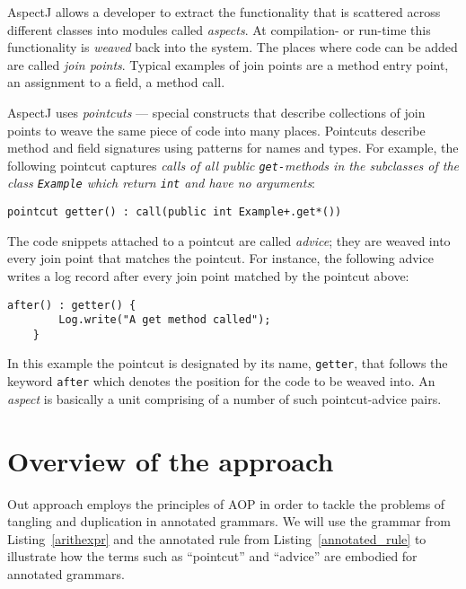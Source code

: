 \documentclass{IOS-Book-Article}     %
\newcommand{\lstref}[1]{Listing~\ref{#1}}
\begin{document}
AspectJ allows a developer to extract the functionality that is scattered across different classes into modules called \emph{aspects}. At compilation- or run-time this functionality is \emph{weaved} back into the system. The places where code can be added are called \emph{join points}. Typical examples of join points are a method entry point, an assignment to a field, a method call. 

AspectJ uses \emph{pointcuts} --- special constructs that describe collections of join points to weave the same piece of code into many places. Pointcuts describe method and field signatures using patterns for names and types. For example, the following pointcut captures \textit{calls of all public \texttt{get-}methods in the subclasses of the class \texttt{Example} which return \texttt{int} and have no arguments}:
\begin{lstlisting}[language={[AspectJ]Java}]
    pointcut getter() : call(public int Example+.get*())
\end{lstlisting}

The code snippets attached to a pointcut are called \emph{advice}; they are weaved into every join point that matches the pointcut. For instance, the following advice writes a log record after every join point matched by the pointcut above:
\begin{lstlisting}[language={[AspectJ]Java}]
    after() : getter() {
        Log.write("A get method called");
    }
\end{lstlisting}
In this example the pointcut is designated by its name, \texttt{getter}, that follows the keyword \texttt{after} which denotes the position for the code to be weaved into.
An \emph{aspect} is basically a unit comprising of a number of such pointcut-advice pairs.

\section{Overview of the approach}\label{Approach}

Out approach employs the principles of AOP in order to tackle the problems of tangling and duplication in annotated grammars. We will use the grammar from \lstref{arithexpr} and the annotated rule from \lstref{annotated_rule} to illustrate how the terms such as ``pointcut'' and ``advice'' are embodied for annotated grammars. 
\end{document}
